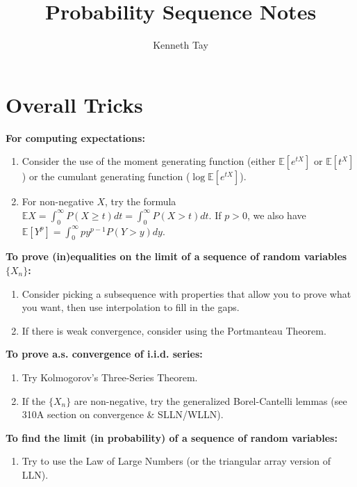 \documentclass[twoside]{article}
\newcommand{\dis}{\displaystyle}
\newcommand\bbE{\mathbb{E}}
\begin{document}
\title{Probability Sequence Notes}
\author{Kenneth Tay}
\date{\vspace{-3ex}}
\maketitle

\section*{Overall Tricks}
\textbf{For computing expectations:}
\begin{enumerate}
\item Consider the use of the moment generating function (either $\bbE [e^{tX}]$ or $\bbE [t^X]$) or the cumulant generating function ($\log \bbE [e^{tX}]$).

\item For non-negative $X$, try the formula $\bbE X = \dis\int_0^\infty P(X \geq t) dt = \dis\int_0^\infty P(X > t)dt$. If $p > 0$, we also have $\bbE [Y^p] = \dis\int_0^\infty py^{p-1} P(Y > y) dy$.

\end{enumerate}

\textbf{To prove (in)equalities on the limit of a sequence of random variables $\{ X_n \}$:}
\begin{enumerate}
\item Consider picking a subsequence with properties that allow you to prove what you want, then use interpolation to fill in the gaps.

\item If there is weak convergence, consider using the Portmanteau Theorem.
\end{enumerate}

\textbf{To prove a.s. convergence of i.i.d. series:}
\begin{enumerate}
\item Try Kolmogorov's Three-Series Theorem.

\item If the $\{ X_n\}$ are non-negative, try the generalized Borel-Cantelli lemmas (see 310A section on convergence \& SLLN/WLLN).
\end{enumerate}

\textbf{To find the limit (in probability) of a sequence of random variables:}
\begin{enumerate}
\item Try to use the Law of Large Numbers (or the triangular array version of LLN).
\end{enumerate}
\end{document}

